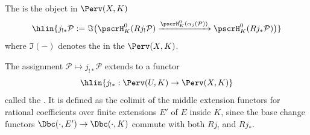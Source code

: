 \begin{definition}
The  is the object in $\Perv(X, K)$
$$\hlin{j_{!*} \mathcal{P} := \Im\bigl(\pscrH^0_K(Rj_! \mathcal{P}) \xrightarrow{\pscrH^0_K(\alpha_j(\mathcal{P}))} \pscrH^0_K(Rj_* \mathcal{P})\bigr)}$$
where $\Im(-)$ denotes the  in the  $\Perv(X, K)$.

The assignment $\mathcal{P} \mapsto j_{!*}\mathcal{P}$ extends to a functor
$$\hlin{j_{!*}: \Perv(U, K) \to \Perv(X, K)}$$
called the . It is defined as the colimit of the middle extension functors for rational coefficients over finite extensions $E'$ of $E$ inside $K$, since the base change functors $\Dbc(\cdot, E') \to \Dbc(\cdot, K)$ commute with both $Rj_!$ and $Rj_*$.
\end{definition}
